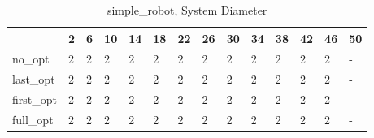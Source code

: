 \begin{table}
\caption{simple_robot, System Diameter}
\label{simple_robot_diam}
\begin{tabular}{llllllllllllll}
\toprule
 & 2 & 6 & 10 & 14 & 18 & 22 & 26 & 30 & 34 & 38 & 42 & 46 & 50 \\
\midrule
no_opt & 2 & 2 & 2 & 2 & 2 & 2 & 2 & 2 & 2 & 2 & 2 & 2 & - \\
last_opt & 2 & 2 & 2 & 2 & 2 & 2 & 2 & 2 & 2 & 2 & 2 & 2 & - \\
first_opt & 2 & 2 & 2 & 2 & 2 & 2 & 2 & 2 & 2 & 2 & 2 & 2 & - \\
full_opt & 2 & 2 & 2 & 2 & 2 & 2 & 2 & 2 & 2 & 2 & 2 & 2 & - \\
\bottomrule
\end{tabular}
\end{table}
